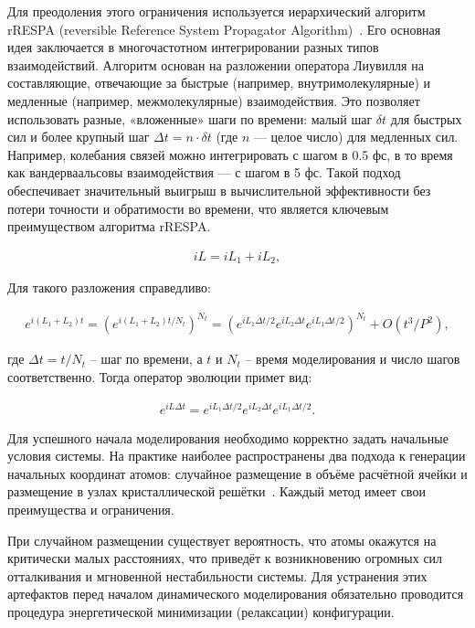 Для преодоления этого ограничения используется иерархический алгоритм rRESPA (reversible Reference System Propagator Algorithm)~\cite{tuckerman_reversible_1992}. Его основная идея заключается в многочастотном интегрировании разных типов взаимодействий. Алгоритм основан на разложении оператора Лиувилля на составляющие, отвечающие за быстрые (например, внутримолекулярные) и медленные (например, межмолекулярные) взаимодействия. Это позволяет использовать разные, «вложенные» шаги по времени: малый шаг $\delta t$ для быстрых сил и более крупный шаг $\Delta t = n \cdot \delta t$ (где $n$ — целое число) для медленных сил. Например, колебания связей можно интегрировать с шагом в 0.5 фс, в то время как вандерваальсовы взаимодействия — с шагом в 5 фс. Такой подход обеспечивает значительный выигрыш в вычислительной эффективности без потери точности и обратимости во времени, что является ключевым преимуществом алгоритма rRESPA.

\begin{align}
	iL = iL_1 + iL_2,
\end{align}

Для такого разложения справедливо:

\begin{align}
	e^{i(L_1+L_2)t} = (e^{i(L_1 + L_2)t/N_t})^{N_t} = (e^{i L_1 \Delta t /2} e^{i L_2 \Delta t} e^{i L_1 \Delta t /2})^{N_t} + O(t^3/P^2),
\end{align}

где $\Delta t = t/N_t$ \--- шаг по времени, а $t$ и $N_t$ \--- время моделирования и число шагов соответственно. Тогда оператор эволюции примет вид:

\begin{align}
	 e^{i L \Delta t} = e^{i L_1 \Delta t /2} e^{i L_2 \Delta t} e^{i L_1 \Delta t /2}.
\end{align}
  
Для успешного начала моделирования необходимо корректно задать начальные условия системы. На практике наиболее распространены два подхода к генерации начальных координат атомов: случайное размещение в объёме расчётной ячейки и размещение в узлах кристаллической решётки~\cite{frenkel_understanding_2001}. Каждый метод имеет свои преимущества и ограничения.

При случайном размещении существует вероятность, что атомы окажутся на критически малых расстояниях, что приведёт к возникновению огромных сил отталкивания и мгновенной нестабильности системы. Для устранения этих артефактов перед началом динамического моделирования обязательно проводится процедура энергетической минимизации (релаксации) конфигурации.

